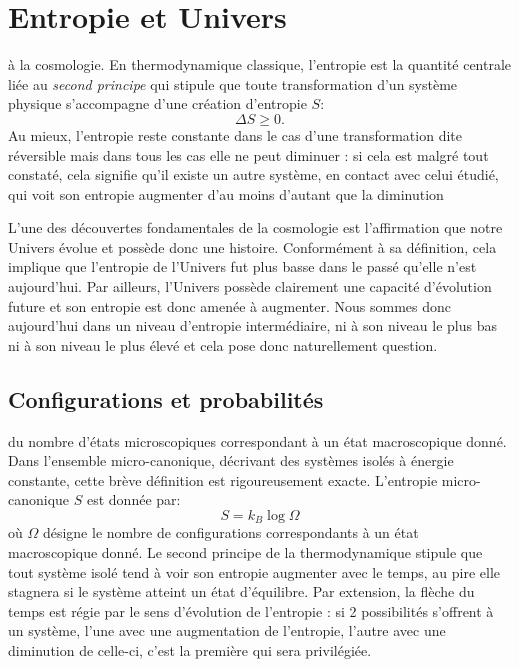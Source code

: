 \chapter{Entropie et Univers}
 à la cosmologie. En thermodynamique classique, l'entropie est la quantité centrale liée au \textit{second principe} qui stipule que toute transformation d'un système physique s'accompagne d'une création d'entropie $S$:
\begin{equation}
\Delta S \ge 0.
\end{equation}
Au mieux, l'entropie reste constante dans le cas d'une transformation dite réversible mais dans tous les cas elle ne peut diminuer : si cela est malgré tout constaté, cela signifie qu'il existe un autre système, en contact avec celui étudié, qui voit son entropie augmenter d'au moins d'autant que la diminution 

L'une des découvertes fondamentales de la cosmologie est l'affirmation que notre Univers évolue et possède donc une histoire. Conformément à sa définition, cela implique que l'entropie de l'Univers fut plus basse dans le passé qu'elle n'est aujourd'hui. Par ailleurs, l'Univers possède clairement une capacité d'évolution future et son entropie est donc amenée à augmenter. Nous sommes donc aujourd'hui dans un niveau d'entropie intermédiaire, ni à son niveau le plus bas ni à son niveau le plus élevé et cela pose donc naturellement question.

\section{Configurations et probabilités}
 du nombre d'états microscopiques correspondant à un état macroscopique donné. Dans l'ensemble micro-canonique, décrivant des systèmes isolés à énergie constante, cette brève définition est rigoureusement exacte. L'entropie micro-canonique $S$ est donnée par:
\begin{equation}
S=k_B\log \Omega
\end{equation}
où $\Omega$ désigne le nombre de configurations correspondants à un état macroscopique donné. Le second principe de la thermodynamique stipule que tout système isolé tend à voir son entropie augmenter avec le temps, au pire elle stagnera si le système atteint un état d'équilibre. Par extension, la flèche du temps est régie par le sens d'évolution de l'entropie : si 2 possibilités s'offrent à un système, l'une avec une augmentation de l'entropie, l'autre avec une diminution de celle-ci, c'est la première qui sera privilégiée.

